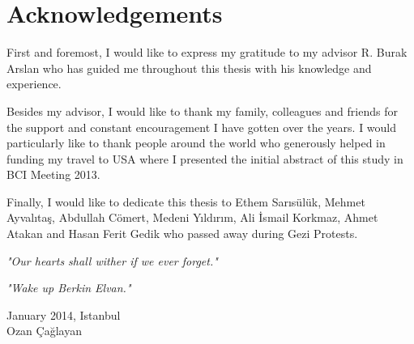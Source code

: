 \documentclass[12pt]{article}
\title{}
\renewcommand{\headrulewidth}{0pt}
\numberwithin{equation}{section}
\numberwithin{figure}{section}
\numberwithin{table}{section}
\begin{document}
% 



\clearpage
\vspace*{-0.35cm}
\section*{Acknowledgements}
\vspace*{6pt}
\par{
    First and foremost, I would like to express my gratitude to my advisor
    R. Burak Arslan who has guided me throughout this thesis with
    his knowledge and experience.
}
\par{
    Besides my advisor, I would like to thank my family, colleagues and friends
    for the support and constant encouragement I have gotten over the years.
    I would particularly like to thank people around the world who generously helped
    in funding my travel to USA where I presented the initial abstract of this study
    in BCI Meeting 2013.
}
\par{
    Finally, I would like to dedicate this thesis to Ethem Sarısülük,
    Mehmet Ayvalıtaş, Abdullah Cömert, Medeni Yıldırım, Ali İsmail Korkmaz,
    Ahmet Atakan and Hasan Ferit Gedik who passed away during Gezi Protests.
}
\par{
    \emph{"Our hearts shall wither if we ever forget."}
}
\par{
    \emph{"Wake up Berkin Elvan."}
}

\vspace*{2cm}
\begin{flushright}
January 2014, Istanbul \\
Ozan Çağlayan
\end{flushright}
\clearpage

\fancypagestyle{plain}{\fancyhf{}
  \renewcommand{\headrulewidth}{0pt}}
\setcounter{tocdepth}{5}
\renewcommand\contentsname{\normalsize\bfseries Table of Contents}
\thispagestyle{empty}
\vspace*{0.15cm}
\tableofcontents
\clearpage

\renewcommand\nomname{\normalsize\bfseries List of Abbreviations}
\thispagestyle{empty}
\vspace*{0.15cm}
\printnomenclature
\clearpage
\end{document}
